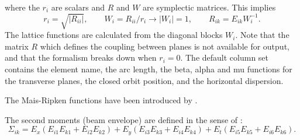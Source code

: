 where the $r_i$ are scalars and $R$ and $W$ are symplectic matrices.
This implies
\[
r_i = \sqrt{|R_{ii}|}, \qquad
W_i = R_{ii} / r_i \rightarrow |W_i| = 1, \qquad 
R_{ik} = E_{ik} W_i^{-1}.
\]
The lattice functions are calculated from the diagonal blocks $W_i$.
Note that the matrix $R$ which defines the coupling between planes is
not available for output,
and that the formalism breaks down when $r_i=0$.
The default column set contains the element name,
the arc length, the beta, alpha and mu functions for the transverse
planes,
the closed orbit position, and the horizontal dispersion.

The Mais-Ripken functions have been introduced by
.

The second moments (beam envelope) are defined in the sense of
: 
\[
  \Sigma_{ik} = E_x ( E_{i1} E_{k1} + E_{i2} E_{k2}) +
                E_y ( E_{i3} E_{k3} + E_{i4} E_{k4}) +
                E_t ( E_{i5} E_{k5} + E_{i6} E_{k6}).
\]

